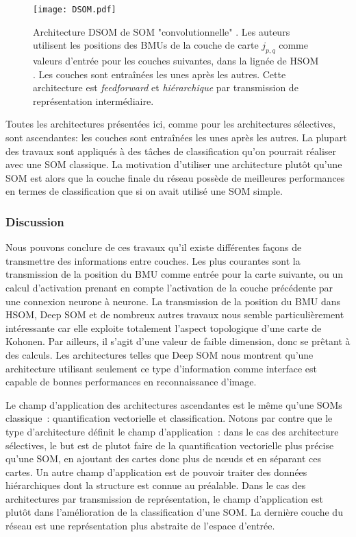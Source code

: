\documentclass[../main]{subfiles}
\begin{document}
\begin{figure}
    \texttt{[image: DSOM.pdf]}
    \caption{Architecture DSOM de SOM "convolutionnelle" \cite{liu_deep_2015}. Les auteurs utilisent les positions des BMUs de la couche de carte $j_{p,q}$ comme valeurs d'entrée pour les couches suivantes, dans la lignée de HSOM \cite{lampinen_clustering_1992}. Les couches sont entraînées les unes après les autres. Cette architecture est \emph{feedforward} et \emph{hiérarchique} par transmission de représentation intermédiaire. \label{fig:dsom}}
\end{figure}

Toutes les architectures présentées ici, comme pour les architectures sélectives, sont ascendantes: les couches sont entraînées les unes après les autres. 
La plupart des travaux sont appliqués à des tâches de classification qu'on pourrait réaliser avec une SOM classique.
La motivation d'utiliser une architecture plutôt qu'une SOM est alors que la couche finale du réseau possède de meilleures performances en termes de classification que si on avait utilisé une SOM simple.

\subsubsection{Discussion}
Nous pouvons conclure de ces travaux qu'il existe différentes façons de transmettre des informations entre couches. Les plus courantes sont la transmission de la position du BMU comme entrée pour la carte suivante, ou un calcul d'activation prenant en compte l'activation de la couche précédente par une connexion neurone à neurone.
La transmission de la position du BMU dans HSOM, Deep SOM et de nombreux autres travaux nous semble particulièrement intéressante car elle exploite totalement l'aspect topologique d'une carte de Kohonen. Par ailleurs, il s'agit d'une valeur de faible dimension, donc se prêtant à des calculs. Les architectures telles que Deep SOM nous montrent qu'une architecture utilisant seulement ce type d'information comme interface est capable de bonnes performances en reconnaissance d'image.

Le champ d'application des architectures ascendantes est le même qu'une SOMs classique~: quantification vectorielle et classification. Notons par contre que le type d'architecture définit le champ d'application~: 
dans le cas des architecture sélectives, le but est de plutot faire de la quantification vectorielle plus précise qu'une SOM, en ajoutant des cartes donc plus de n\oe{}uds et en séparant ces cartes. Un autre champ d'application est de pouvoir traiter des données hiérarchiques dont la structure est connue au préalable.
Dans le cas des architectures par transmission de représentation, le champ d'application est plutôt dans l'amélioration de la classification d'une SOM. La dernière couche du réseau est une représentation plus abstraite de l'espace d'entrée.
\end{document}
